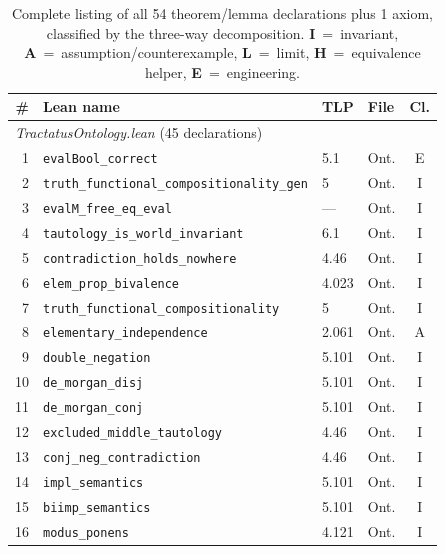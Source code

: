 \documentclass[10pt, letterpaper]{article}
\theoremstyle{definition}
\theoremstyle{remark}
\begin{document}
\begin{table}[p]
\centering
\footnotesize
\caption{Complete listing of all 54 theorem/lemma declarations
  plus 1 axiom, classified by the three-way decomposition.
  \textbf{I}~=~invariant, \textbf{A}~=~assumption/counterexample,
  \textbf{L}~=~limit, \textbf{H}~=~equivalence helper,
  \textbf{E}~=~engineering.}
\label{tab:decomposition}
\begin{tabular}{@{}rlllc@{}}
\toprule
\# & \textbf{Lean name} & \textbf{TLP} & \textbf{File} & \textbf{Cl.} \\
\midrule
\multicolumn{5}{l}{\emph{TractatusOntology.lean} (45 declarations)} \\
\midrule
 1 & \texttt{evalBool\_correct}                        & 5.1     & Ont. & E \\
 2 & \texttt{truth\_functional\_compositionality\_gen}  & 5       & Ont. & I \\
 3 & \texttt{evalM\_free\_eq\_eval}                     & ---     & Ont. & I \\
 4 & \texttt{tautology\_is\_world\_invariant}            & 6.1     & Ont. & I \\
 5 & \texttt{contradiction\_holds\_nowhere}              & 4.46    & Ont. & I \\
 6 & \texttt{elem\_prop\_bivalence}                      & 4.023   & Ont. & I \\
 7 & \texttt{truth\_functional\_compositionality}        & 5       & Ont. & I \\
 8 & \texttt{elementary\_independence}                   & 2.061   & Ont. & A \\
 9 & \texttt{double\_negation}                           & 5.101   & Ont. & I \\
10 & \texttt{de\_morgan\_disj}                           & 5.101   & Ont. & I \\
11 & \texttt{de\_morgan\_conj}                           & 5.101   & Ont. & I \\
12 & \texttt{excluded\_middle\_tautology}                & 4.46    & Ont. & I \\
13 & \texttt{conj\_neg\_contradiction}                   & 4.46    & Ont. & I \\
14 & \texttt{impl\_semantics}                            & 5.101   & Ont. & I \\
15 & \texttt{biimp\_semantics}                           & 5.101   & Ont. & I \\
16 & \texttt{modus\_ponens}                              & 4.121   & Ont. & I \\

\end{tabular}
\end{table}
\end{document}
